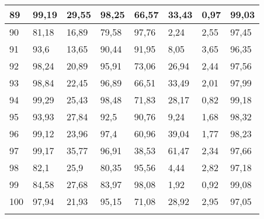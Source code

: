 \begin{longtable}[c]{|l|l|l|l|l|l|l|l|}
89              & 99,19        & 29,55        & 98,25       & 66,57         & 33,43         & 0,97          & 99,03         \\ \hline
90              & 81,18        & 16,89        & 79,58       & 97,76         & 2,24          & 2,55          & 97,45         \\ \hline
91              & 93,6         & 13,65        & 90,44       & 91,95         & 8,05          & 3,65          & 96,35         \\ \hline
92              & 98,24        & 20,89        & 95,91       & 73,06         & 26,94         & 2,44          & 97,56         \\ \hline
93              & 98,84        & 22,45        & 96,89       & 66,51         & 33,49         & 2,01          & 97,99         \\ \hline
94              & 99,29        & 25,43        & 98,48       & 71,83         & 28,17         & 0,82          & 99,18         \\ \hline
95              & 93,93        & 27,84        & 92,5        & 90,76         & 9,24          & 1,68          & 98,32         \\ \hline
96              & 99,12        & 23,96        & 97,4        & 60,96         & 39,04         & 1,77          & 98,23         \\ \hline
97              & 99,17        & 35,77        & 96,91       & 38,53         & 61,47         & 2,34          & 97,66         \\ \hline
98              & 82,1         & 25,9         & 80,35       & 95,56         & 4,44          & 2,82          & 97,18         \\ \hline
99              & 84,58        & 27,68        & 83,97       & 98,08         & 1,92          & 0,92          & 99,08         \\ \hline
100             & 97,94        & 21,93        & 95,15       & 71,08         & 28,92         & 2,95          & 97,05         \\ \hline
\label{anx:gris}
\end{longtable}
